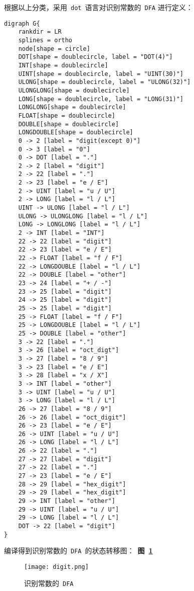 \documentclass[lang=cn,11pt,a4paper]{paper}
\begin{document}
根据以上分类，采用\ \lstinline{dot}\ 语言对识别常数的\ \lstinline{DFA} 进行定义：
\begin{lstlisting}
digraph G{
    rankdir = LR
    splines = ortho
    node[shape = circle]
    DOT[shape = doublecircle, label = "DOT(4)"]
    INT[shape = doublecircle]
    UINT[shape = doublecircle, label = "UINT(30)"]
    ULONG[shape = doublecircle, label = "ULONG(32)"]
    ULONGLONG[shape = doublecircle]
    LONG[shape = doublecircle, label = "LONG(31)"]
    LONGLONG[shape = doublecircle]
    FLOAT[shape = doublecircle]
    DOUBLE[shape = doublecircle]
    LONGDOUBLE[shape = doublecircle]
    0 -> 2 [label = "digit(except 0)"]
    0 -> 3 [label = "0"]
    0 -> DOT [label = "."]
    2 -> 2 [label = "digit"]
    2 -> 22 [label = "."]
    2 -> 23 [label = "e / E"]
    2 -> UINT [label = "u / U"]
    2 -> LONG [label = "l / L"]
    UINT -> ULONG [label = "l / L"]
    ULONG -> ULONGLONG [label = "l / L"]
    LONG -> LONGLONG [label = "l / L"]
    2 -> INT [label = "INT"]
    22 -> 22 [label = "digit"]
    22 -> 23 [label = "e / E"]
    22 -> FLOAT [label = "f / F"]
    22 -> LONGDOUBLE [label = "l / L"]
    22 -> DOUBLE [label = "other"]
    23 -> 24 [label = "+ / -"]
    23 -> 25 [label = "digit"]
    24 -> 25 [label = "digit"]
    25 -> 25 [label = "digit"]
    25 -> FLOAT [label = "f / F"]
    25 -> LONGDOUBLE [label = "l / L"]
    25 -> DOUBLE [label = "other"]
    3 -> 22 [label = "."]
    3 -> 26 [label = "oct_digt"]
    3 -> 27 [label = "8 / 9"]
    3 -> 23 [label = "e / E"]
    3 -> 28 [label = "x / X"]
    3 -> INT [label = "other"]
    3 -> UINT [label = "u / U"]
    3 -> LONG [label = "l / L"]
    26 -> 27 [label = "8 / 9"]
    26 -> 26 [label = "oct_digit"]
    26 -> 23 [label = "e / E"]
    26 -> UINT [label = "u / U"]
    26 -> LONG [label = "l / L"]
    26 -> 22 [label = "."]
    27 -> 27 [label = "digit"]
    27 -> 22 [label = "."]
    27 -> 23 [label = "e / E"]
    28 -> 29 [label = "hex_digit"]
    29 -> 29 [label = "hex_digit"]
    29 -> INT [label = "other"]
    29 -> UINT [label = "u / U"]
    29 -> LONG [label = "l / L"]
    DOT -> 22 [label = "digit"]
}
\end{lstlisting}

编译得到识别常数的\ \lstinline{DFA}\ 的状态转移图：\ \textbf{图\ \ref{fig:识别常数的DFA}}

\begin{figure}[!htb]
    \centering
    \texttt{[image: digit.png]}
    \caption{识别常数的\ \lstinline{DFA}}
    \label{fig:识别常数的DFA}
\end{figure}
\end{document}
